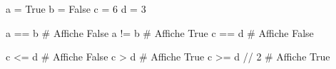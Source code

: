    \begin{definition}{}

       \begin{minipage}{0.32\linewidth}
	\begin{CodePythontexAlt}[TaillePolice=\normalsize, Largeur=1\linewidth,Centre,PremLigne=1, Lignes=false,]{}
a = True
b = False
c = 6
d = 3
        \end{CodePythontexAlt}
    \end{minipage}\hfill
    \begin{minipage}{0.32\linewidth}
	\begin{CodePythontexAlt}[TaillePolice=\normalsize, Largeur=1\linewidth,Centre,PremLigne=1, Lignes=false,]{}
a == b  # Affiche False
a != b  # Affiche True
c == d  # Affiche False
        \end{CodePythontexAlt}
    \end{minipage}\hfill
    \begin{minipage}{0.35\linewidth}
        \begin{CodePythontexAlt}[TaillePolice=\normalsize, Largeur=1\linewidth,Centre,PremLigne=1, Lignes=false,]{}
c <= d  # Affiche False
c > d   # Affiche True
c >= d // 2  # Affiche True

      \end{CodePythontexAlt}
    \end{minipage}    

      
   \end{definition}



